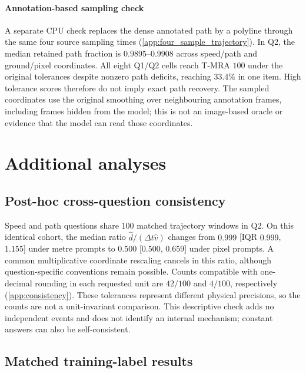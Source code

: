 \documentclass[11pt]{article}
\begin{document}
\paragraph{Annotation-based sampling check}
A separate CPU check replaces the dense annotated path by a polyline through
the same four source sampling times (\ref{app:four_sample_trajectory}). In
Q2, the median retained path fraction is $0.9895$--$0.9908$ across speed/path
and ground/pixel coordinates. All eight Q1/Q2 cells reach T-MRA $100$ under
the original tolerances despite nonzero path deficits, reaching $33.4\%$ in
one item. High tolerance scores therefore do not imply exact path recovery.
The sampled coordinates use the original smoothing over neighbouring
annotation frames, including frames hidden from the model; this is not an
image-based oracle or evidence that the model can read those coordinates.

\section{Additional analyses}
\label{supp:additional}

\subsection{Post-hoc cross-question consistency}

Speed and path questions share 100 matched trajectory windows in Q2. On
this identical cohort, the median ratio $\hat d/(\Delta t\hat v)$ changes
from $0.999$ [IQR $0.999$, $1.155$] under metre prompts to
$0.500$ [$0.500$, $0.659$] under pixel prompts. A common multiplicative
coordinate rescaling cancels in this ratio, although question-specific
conventions remain possible. Counts compatible with one-decimal rounding
in each requested unit are $42/100$ and $4/100$, respectively
(\ref{app:consistency}). These tolerances represent different physical
precisions, so the counts are not a unit-invariant comparison.
This descriptive check adds no independent events and does not identify an
internal mechanism; constant answers can also be self-consistent.

\subsection{Matched training-label results}
\label{sec:matched_label_results}
\end{document}
